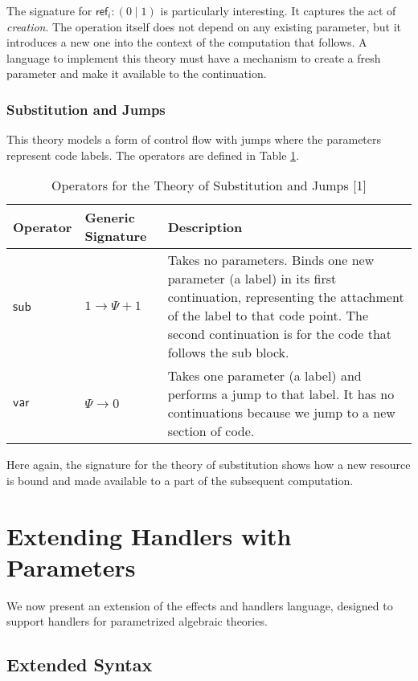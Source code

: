 \documentclass{article}
\theoremstyle{definition}
\theoremstyle{remark}
\newcommand\newref{\mathsf{ref}}
\newcommand\sub{\mathsf{sub}}
\newcommand\var{\mathsf{var}}
\begin{document}
The signature for $\newref_i: (0\mid 1)$ is particularly interesting.
It captures the act of \emph{creation}. The operation itself does not depend on any existing parameter, but it introduces a new one into the context of the computation that follows.
A language to implement this theory must have a mechanism to create a fresh parameter and make it available to the continuation.

\subsubsection{Substitution and Jumps}

This theory models a form of control flow with jumps where the parameters represent code labels. The operators are defined in Table \ref{tab:subst}.

\begin{table}[h!]
  \centering
  \begin{tabular}{l l p{8cm}}
    \hline
    \textbf{Operator} & \textbf{Generic Signature} & \textbf{Description} \\
    \hline
    $\sub$ & $1 \to \Psi + 1$ & Takes no parameters. Binds one new parameter (a label) in its first continuation, representing the attachment of the label to that code point.
    The second continuation is for the code that follows the sub block. \\
    $\var$ & $\Psi \to 0$     & Takes one parameter (a label) and performs a jump to that label. It has no continuations because we jump to a new section of code. \\
    \hline
  \end{tabular}
  \caption{Operators for the Theory of Substitution and Jumps [1]}
  \label{tab:subst}
\end{table}

Here again, the signature for the theory of substitution shows how a new resource is bound and made available to a part of the subsequent computation.

\section{Extending Handlers with Parameters}

We now present an extension of the effects and handlers language, designed to support handlers for parametrized algebraic theories.

\subsection{Extended Syntax}
\end{document}
